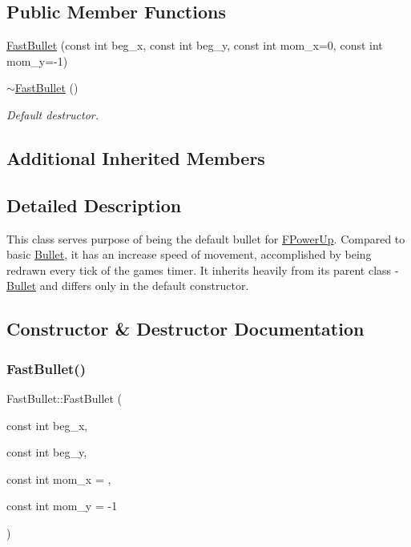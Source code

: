 \subsection*{Public Member Functions}
\begin{DoxyCompactItemize}
\item 
\hyperlink{classFastBullet_ae8800f319fabc46ec8c44f23aa21c485}{Fast\+Bullet} (const int beg\+\_\+x, const int beg\+\_\+y, const int mom\+\_\+x=0, const int mom\+\_\+y=-\/1)
\item 
\hyperlink{classFastBullet_a276249fe2605b4b3706eee2e33e2b152}{$\sim$\+Fast\+Bullet} ()
\begin{DoxyCompactList}\small\item\em Default destructor. \end{DoxyCompactList}\end{DoxyCompactItemize}
\subsection*{Additional Inherited Members}


\subsection{Detailed Description}
This class serves purpose of being the default bullet for \hyperlink{classFPowerUp}{F\+Power\+Up}. Compared to basic \hyperlink{classBullet}{Bullet}, it has an increase speed of movement, accomplished by being redrawn every tick of the game\textquotesingle{}s timer. It inherits heavily from it\textquotesingle{}s parent class -\/ \hyperlink{classBullet}{Bullet} and differs only in the default constructor. 

\subsection{Constructor \& Destructor Documentation}
\mbox{\label{classFastBullet_ae8800f319fabc46ec8c44f23aa21c485}} 
\subsubsection{\texorpdfstring{Fast\+Bullet()}{FastBullet()}}
{\footnotesize\ttfamily Fast\+Bullet\+::\+Fast\+Bullet (\begin{DoxyParamCaption}\item[{const int}]{beg\+\_\+x,  }\item[{const int}]{beg\+\_\+y,  }\item[{const int}]{mom\+\_\+x = {},  }\item[{const int}]{mom\+\_\+y = {\ttfamily -\/1} }\end{DoxyParamCaption})}

